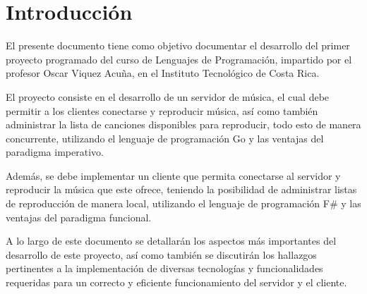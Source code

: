 \section{Introducción}

El presente documento tiene como objetivo documentar el desarrollo del primer
proyecto programado del curso de Lenguajes de Programación, impartido por el
profesor Oscar Viquez Acuña, en el Instituto Tecnológico de Costa Rica.

El proyecto consiste en el desarrollo de un servidor de música, el cual debe
permitir a los clientes conectarse y reproducir música, así como también
administrar la lista de canciones disponibles para reproducir, todo esto 
de manera concurrente, utilizando el lenguaje de programación Go y las ventajas
del paradigma imperativo.

Además, se debe implementar un cliente que permita conectarse al servidor y
reproducir la música que este ofrece, teniendo la posibilidad de administrar
listas de reproducción de manera local, utilizando el lenguaje de programación
F\# y las ventajas del paradigma funcional.

A lo largo de este documento se detallarán los aspectos más importantes del
desarrollo de este proyecto, así como también se discutirán los hallazgos
pertinentes a la implementación de diversas tecnologías y funcionalidades
requeridas para un correcto y eficiente funcionamiento del servidor y el
cliente.